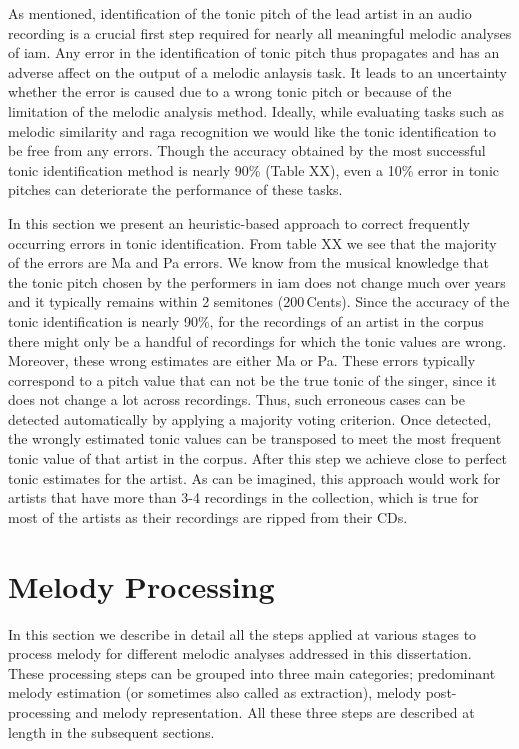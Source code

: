 {As mentioned, identification of the tonic pitch of the lead artist in an audio recording is a crucial first step required for nearly all meaningful melodic analyses of \gls{iam}. Any error in the identification of tonic pitch thus propagates and has an adverse affect on the output of a melodic anlaysis task. It leads to an uncertainty whether the error is caused due to a wrong tonic pitch or because of the limitation of the melodic analysis method. Ideally, while evaluating tasks such as melodic similarity and \gls{raga} recognition we would like the tonic identification to be free from any errors. Though the accuracy obtained by the most successful tonic identification method is nearly 90\% (Table XX), even a 10\% error in tonic pitches can deteriorate the performance of these tasks. 

In this section we present an heuristic-based approach to correct frequently occurring errors in tonic identification. From table XX we see that the majority of the errors are Ma and Pa errors. We know from the musical knowledge that the tonic pitch chosen  by the performers in \gls{iam} does not change much over years and it typically remains within 2 semitones (200\,Cents). Since the accuracy of the tonic identification is nearly 90\%, for the recordings of an artist in the corpus there might only be a handful of recordings for which the tonic values are wrong. Moreover, these wrong estimates are either Ma or Pa. These errors typically correspond to a pitch value that can not be the true tonic of the singer, since it does not change a lot across recordings. Thus, such erroneous cases can be detected automatically by applying a majority voting criterion. Once detected, the wrongly estimated tonic values can be transposed to meet the most frequent tonic value of that artist in the corpus. After this step we achieve close to perfect tonic estimates for the artist. As can be imagined, this approach would work for artists that have more than 3-4 recordings in the collection, which is true for most of the artists as their recordings are ripped from their CDs.


\section{Melody Processing}
\label{sec:data_preprocessing_melody_processing}

In this section we describe in detail all the steps applied at various stages to process melody for different melodic analyses addressed in this dissertation. These processing steps can be grouped into three main categories; predominant melody estimation (or sometimes also called as extraction), melody post-processing and melody representation. All these three steps are described at length in the subsequent sections. 

}
